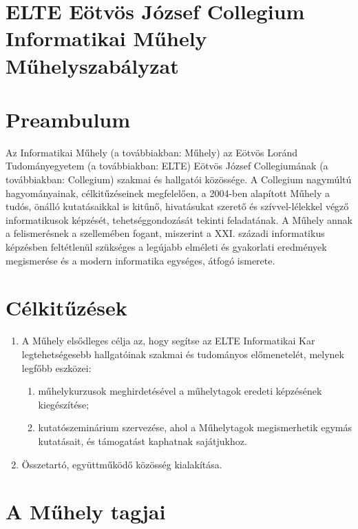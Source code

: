 \documentclass{../styles/rulebook}
\begin{document}
\section*{ELTE Eötvös József Collegium \\ Informatikai Műhely\\ \vspace{0.5em} Műhelyszabályzat} 

\vspace{2em}

\section*{Preambulum}

Az Informatikai Műhely (a továbbiakban: Műhely) az Eötvös Loránd Tudományegyetem (a továbbiakban: ELTE) Eötvös József Collegiumának (a továbbiakban: Collegium) szakmai és hallgatói közössége.
A Collegium nagymúltú hagyományainak, célkitűzéseinek megfelelően, a 2004-ben alapított Műhely a tudós, önálló kutatásaikkal is kitűnő, hivatásukat szerető és szívvel-lélekkel végző informatikusok képzését, tehetséggondozását tekinti feladatának. A Műhely annak a felismerésnek a szellemében fogant, miszerint a XXI. századi informatikus képzésben feltétlenül szükséges a legújabb elméleti és gyakorlati eredmények megismerése és a modern informatika egységes, átfogó ismerete.

\section{Célkitűzések}

\begin{enumerate}
	\item A Műhely elsődleges célja az, hogy segítse az ELTE Informatikai Kar legtehetségesebb hallgatóinak szakmai és tudományos előmenetelét, melynek legfőbb eszközei:
	\begin{enumerate}
		\item műhelykurzusok meghirdetésével a műhelytagok eredeti képzésének kiegészítése;
		\item kutatószeminárium szervezése, ahol a Műhelytagok megismerhetik egymás kutatásait, és támogatást kaphatnak sajátjukhoz.
	\end{enumerate}
	\item Összetartó, együttműködő közösség kialakítása.
\end{enumerate}

\section{A Műhely tagjai}
\end{document}
